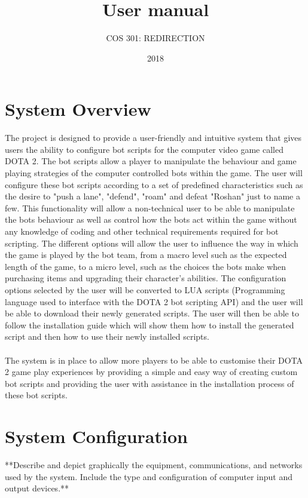 \documentclass{article}
\begin{document}
\title{User manual}
\date{2018}
\author{COS 301: REDIRECTION}
\maketitle
\pagebreak
\tableofcontents
\pagebreak

\section{System Overview}
The project is designed to provide a user-friendly and intuitive system that gives users the ability to configure bot scripts for the computer video game called DOTA 2. The bot scripts allow a player to manipulate the behaviour and game playing strategies of the computer controlled bots within the game. The user will configure these bot scripts according to a set of predefined characteristics such as the desire to "push a lane", "defend", "roam" and  defeat "Roshan" just to name a few. This functionality will allow a non-technical user to be able to manipulate the bots behaviour as well as control how the bots act within the game without any knowledge of coding and other technical requirements required for bot scripting. The different options will allow the user to influence the way in which the game is played by the bot team, from a macro level such as the expected length of the game, to a micro level, such as the choices the bots make when purchasing items and upgrading their character’s abilities. The configuration options selected by the user will be converted to LUA scripts (Programming language used to interface with the DOTA 2 bot scripting API) and the user will be able to download their newly generated scripts. The user will then be able to follow the installation guide which will show them how to install the generated script and then how to use their newly installed scripts.
\\\\
The system is in place to allow more players to be able to customise their DOTA 2 game play experiences by providing a simple and easy way of creating custom bot scripts and providing the user with assistance in the installation process of these bot scripts. 

	
\section{System Configuration}
**Describe and depict graphically the equipment, communications, and networks used by
the system. Include the type and configuration of computer input and output devices.**\newpage
\end{document}
